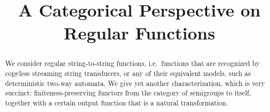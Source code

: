 \documentclass[a4paper,english,cleveref, autoref, thm-restate, numberwithinsect]{lipics-v2021}
\title{A Categorical Perspective on Regular Functions} %
\begin{document}
\maketitle

\begin{abstract}
    We consider regular string-to-string functions, i.e.~functions that are recognized by copyless streaming string transducers, or  any of their equivalent models, such as deterministic two-way automata. We give yet another characterization, which is very succinct: finiteness-preserving functors from the category of semigroups to itself, together with a certain output function that is a natural transformation.
\end{abstract}

\newcommand{\moncat}{\mathrm{Mon}}
\newcommand{\semcat}{\mathrm{Sem}}











\appendix

\newpage




\end{document}
